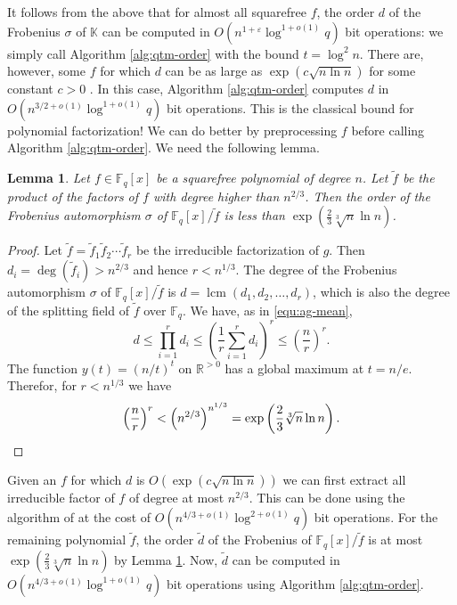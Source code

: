 \documentclass{article}
\theoremstyle{plain}
\newtheorem{lemma}[theorem]{Lemma}
\theoremstyle{definition}
\DeclareMathOperator{\lcm}{lcm} %
\def\K{\ensuremath{\mathbb{K}}}
\def\R{\ensuremath{\mathbb{R}}}
\def\F{\ensuremath{\mathbb{F}}}
\begin{document}
It follows from the above that for almost all squarefree $f$, the order $d$ of the Frobenius 
$\sigma$ of $\K$ can be computed in $O(n^{1 + \varepsilon}\log^{1 + o(1)}q)$ bit operations: we simply 
call Algorithm \ref{alg:qtm-order} with the bound $t = \log^2n$. There are, however, some $f$ for 
which $d$ can be as large as $\exp(c\sqrt{n \ln n})$ for some constant $c > 0$  
\cite{erdos1965some}. In this case, Algorithm \ref{alg:qtm-order} computes $d$ in $O(n^{3/2 + 
o(1)}\log^{1 + o(1)}q)$ bit operations. This is the classical bound for polynomial factorization! 
We can do better by preprocessing $f$ before calling Algorithm \ref{alg:qtm-order}. We need the 
following lemma.
\begin{lemma}
\label{lem:frob-sub-ord}
	Let $f \in \F_q[x]$ be a squarefree polynomial of degree $n$. Let $\tilde{f}$ be the product of 
	the factors of $f$ with degree higher than $n^{2 / 3}$. Then the order of the Frobenius 
	automorphism $\sigma$ of $\F_q[x] / \tilde{f}$ is less than $\exp(\frac{2}{3}\sqrt[3]{n} \ln 
	n)$.
\end{lemma}
\begin{proof}
	Let $\tilde{f} = \tilde{f}_1\tilde{f}_2 \cdots \tilde{f}_r$ be the irreducible factorization of 
	$g$. Then $d_i = \deg(\tilde{f}_i) > n^{2 / 3}$ and hence $r < n^{1 / 3}$. The degree of the 
	Frobenius automorphism $\sigma$ of $\F_q[x] / \tilde{f}$ is $d = \lcm(d_1, d_2, \dots, d_r)$, 
	which is also the degree of the splitting field of $\tilde{f}$ over $\F_q$. We have, as in 
	\eqref{equ:ag-mean},
	\[ d \le \prod_{i = 1}^rd_i \le \left( \frac{1}{r} \sum_{i = 1}^rd_i \right)^r \le \left( 
	\frac{n}{r} \right)^r. \]
	The function $y(t) = (n / t)^t$ on $\R^{> 0}$ has a global maximum at $t = n / e$. Therefor, 
	for $r < n^{1/3}$ we have
	\[ \left( \frac{n}{r} \right)^r < \left( n^{2 / 3} \right)^{n^{1 / 3}} = \exp\left( \frac{2}{3} 
	\sqrt[3]{n} \ln n \right). \qedhere \]
\end{proof}
Given an $f$ for which $d$ is $O(\exp(c\sqrt{n \ln n}))$ we can first extract all irreducible 
factor of $f$ of degree at most $n^{2 / 3}$. This can be done using the algorithm of \cite[\S 
8]{kedlaya2011fast} at the cost of $O(n^{4 / 3 + o(1)}\log^{2 + o(1)}q)$ bit operations. For the 
remaining polynomial $\tilde{f}$, the order $\tilde{d}$ of the Frobenius of $\F_q[x] / \tilde{f}$ 
is at most $\exp(\frac{2}{3}\sqrt[3]{n} \ln n)$ by Lemma \ref{lem:frob-sub-ord}. Now, $\tilde{d}$ 
can be computed in $O(n^{4 / 3 + o(1)}\log^{1 + o(1)}q)$ bit operations using Algorithm 
\ref{alg:qtm-order}. 
\end{document}
